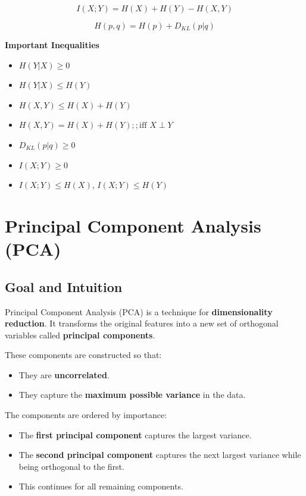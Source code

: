 \documentclass[10pt,a4paper]{article}
\begin{document}
	\begin{equation*}
	I(X;Y) = H(X) + H(Y) - H(X,Y)
	\end{equation*}
	
	\begin{equation*}
	H(p,q) = H(p) + D_{KL}(p | q)
	\end{equation*}
	
	\vspace{0.5em}
	
	\textbf{Important Inequalities}
	
	\begin{itemize}
	\item $H(Y|X) \ge 0$
	\item $H(Y|X) \le H(Y)$
	\item $H(X,Y) \le H(X) + H(Y)$
	\item $H(X,Y) = H(X) + H(Y) ;; \text{iff } X \perp Y$
	\item $D_{KL}(p | q) \ge 0$
	\item $I(X;Y) \ge 0$
	\item $I(X;Y) \le H(X)$, \quad $I(X;Y) \le H(Y)$
	\end{itemize}
	

	\section{Principal Component Analysis (PCA)}

	\subsection{Goal and Intuition}

	Principal Component Analysis (PCA) is a technique for \textbf{dimensionality reduction}. It transforms the original features into a new set of orthogonal variables called \textbf{principal components}.

	These components are constructed so that:

	\begin{itemize}
		\item They are \textbf{uncorrelated}.
		\item They capture the \textbf{maximum possible variance} in the data.
	\end{itemize}

	The components are ordered by importance:

	\begin{itemize}
		\item The \textbf{first principal component} captures the largest variance.
		\item The \textbf{second principal component} captures the next largest variance while being orthogonal to the first.
		\item This continues for all remaining components.
	\end{itemize}
\end{document}
